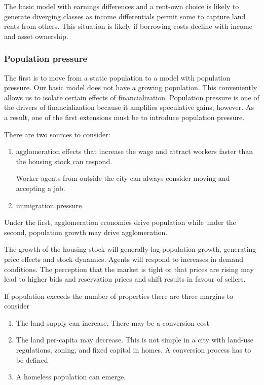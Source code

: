 The basic model with earnings differences and a rent-own choice is likely to generate diverging classes as income differentials permit some to capture land rents from others. This situation is likely if borrowing costs decline with income and asset ownership.



\subsubsection{Population pressure} 

The first is to move from a static population to a model with population pressure. %
Our basic model does not have a growing population. This conveniently allows us to isolate certain effects of financialization. Population pressure is one of the drivers of financialization because it amplifies speculative gains, however. As a result, one of the first extensions must be  to introduce population pressure.

There are two sources to consider: 
\begin{enumerate}
\item agglomeration effects that increase the wage and attract workers faster than the housing stock can respond. 

Worker agents from outside the city can always consider moving and accepting a job. 
\item immigration pressure.
\end{enumerate}
Under the  first, agglomeration economies drive population while under the second, population growth may drive agglomeration.

The growth of the housing stock will generally lag population growth, generating price effects and stock dynamics.
Agents will respond to increases in demand conditions. The perception that the market is tight or that prices are rising may lead to higher bids and reservation prices and shift results in favour of sellers.

If population exceeds the number of properties there are three margins to consider
	\begin{enumerate}
		\item The land supply can increase. There may be a conversion cost
		\item The land per-capita may decrease. This is not simple in a city with land-use regulations, zoning, and fixed capital in homes. A conversion process has to be defined
		\item A homeless population can emerge. 
	\end{enumerate}


